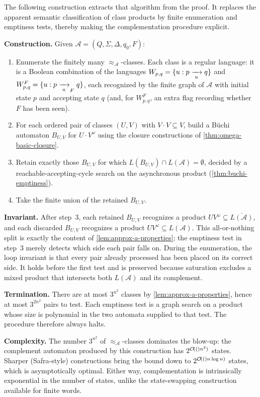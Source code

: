 The following construction extracts that algorithm from the proof.  It
replaces the apparent semantic classification of class products by
finite enumeration and emptiness tests, thereby making the
complementation procedure explicit.

\begin{formaldetails}
\textbf{Construction.}  Given $\mathcal A=(Q,\Sigma,\Delta,q_0,F)$:
\begin{enumerate}[nosep]
  \item Enumerate the finitely many $\approx_{\mathcal A}$-classes.  Each class is a
        regular language: it is a Boolean combination of the languages
        $W_{p,q}=\{u:p\xrightarrow[{\;u\;}]{}q\}$ and
        $W^{F}_{p,q}=\{u:p\xrightarrow[{\;u\;}]{}_{F}q\}$, each recognized by
        the finite graph of $\mathcal A$ with initial state $p$ and accepting
        state $q$ (and, for $W^{F}_{p,q}$, an extra flag recording
        whether $F$ has been seen).
  \item For each ordered pair of classes $(U,V)$ with $V\cdot
        V\subseteq V$, build a B\"uchi automaton $B_{U,V}$ for
        $U\cdot V^\omega$ using the closure constructions of
        \cref{thm:omega-basic-closure}.
  \item Retain exactly those $B_{U,V}$ for which
        $L(B_{U,V})\cap L(\mathcal A)=\emptyset$, decided by a
        reachable-accepting-cycle search on the asynchronous product
        (\cref{thm:buchi-emptiness}).
  \item Take the finite union of the retained $B_{U,V}$.
\end{enumerate}

\textbf{Invariant.}  After step~3, each retained $B_{U,V}$ recognizes a
product $UV^\omega\subseteq\overline{L(\mathcal A)}$, and each discarded
$B_{U,V}$ recognizes a product $UV^\omega\subseteq L(\mathcal A)$.  This
all-or-nothing split is exactly the content of
\cref{lem:approx-a-properties}; the emptiness test in step~3 merely
detects which side each pair falls on.  During the enumeration, the loop
invariant is that every pair already processed has been placed on its
correct side.  It holds before the first test and is preserved because
saturation excludes a mixed product that intersects both $L(\mathcal A)$ and its
complement.

\textbf{Termination.}  There are at most $3^{n^2}$ classes by
\cref{lem:approx-a-properties}, hence at most $3^{2n^2}$ pairs to test.
Each emptiness test is a graph search on a product whose size is
polynomial in the two automata supplied to that test.
The procedure therefore always halts.

\textbf{Complexity.}  The number $3^{n^2}$ of
$\approx_{\mathcal A}$-classes dominates
the blow-up: the complement automaton produced by this construction has
$2^{\mathcal{O}\!\left((\right)n^2)}$ states.  Sharper (Safra-style) constructions bring the
bound down to $2^{\mathcal{O}\!\left((\right)n\log n)}$ states, which is asymptotically optimal.
Either way, complementation is intrinsically exponential in the number
of states, unlike the state-swapping construction available for finite
words.
\end{formaldetails}


